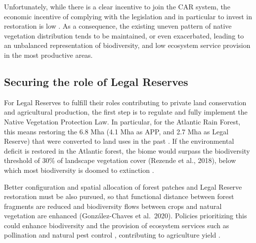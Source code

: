 \documentclass[
	12pt,				%
	oneside,			%
	a4paper,			%
	chapter=TITLE,		%
	section=TITLE,		%
	brazil,			%
	english				%
	]{abntex2}
\begin{document}
Unfortunately, while there is a clear incentive to join the CAR system, the economic incentive of complying with the legislation and in particular to invest in restoration is low \autocite{azevedo_limits_2017}. As a consequence, the existing uneven pattern of native vegetation distribution tends to be maintained, or even exacerbated, leading to an unbalanced representation of biodiversity, and low ecosystem service provision in the most productive areas.

\hypertarget{securing-the-role-of-legal-reserves}{%
\subsection{Securing the role of Legal Reserves}\label{securing-the-role-of-legal-reserves}}

For Legal Reserves to fulfill their roles contributing to private land conservation and agricultural production, the first step is to regulate and fully implement the Native Vegetation Protection Law. In particular, for the Atlantic Rain Forest, this means restoring the 6.8 Mha (4.1 Mha as APP, and 2.7 Mha as Legal Reserve) that were converted to land uses in the past \autocite{guidotti_numeros_2017}. If the environmental deficit is restored in the Atlantic forest, the biome would surpass the biodiversity threshold of 30\% of landscape vegetation cover (Rezende et al., 2018), below which most biodiversity is doomed to extinction \autocite{banks-leite_using_2014}.

Better configuration and spatial allocation of forest patches and Legal Reserve restoration must be also pursued, so that functional distance between forest fragments are reduced \autocite{tambosi_framework_2014} and biodiversity flows between crops and natural vegetation are enhanced (González-Chaves et al.~2020). Policies prioritizing this could enhance biodiversity and the provision of ecosystem services such as pollination and natural pest control \autocite{arroyorodriguez_designing_2020,benayas_enhancement_2009,boesing_effects_2017,dainese_global_2019,garibaldi_stability_2011}, contributing to agriculture yield \autocite{bullock_long-term_2007,wade_ecological_2008}.
\end{document}

